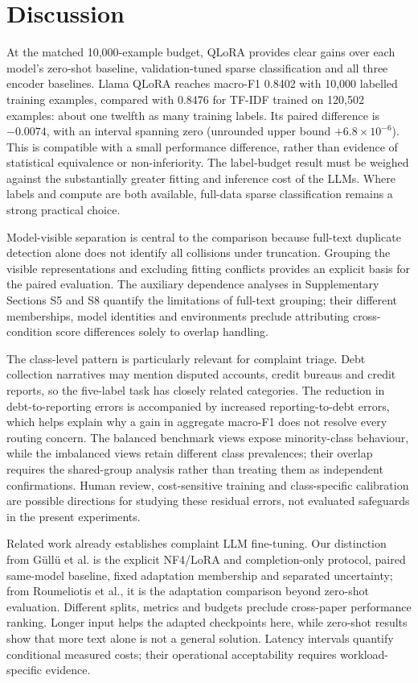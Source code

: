 \documentclass{elektr}
\begin{document}
\section{Discussion}
\label{sec:discussion}
At the matched 10,000-example budget, QLoRA provides clear gains over each model's zero-shot baseline, validation-tuned sparse classification and all three encoder baselines. Llama QLoRA reaches macro-F1 0.8402 with 10,000 labelled training examples, compared with 0.8476 for TF-IDF trained on 120,502 examples: about one twelfth as many training labels. Its paired difference is $-0.0074$, with an interval spanning zero (unrounded upper bound $+6.8\times10^{-6}$). This is compatible with a small performance difference, rather than evidence of statistical equivalence or non-inferiority. The label-budget result must be weighed against the substantially greater fitting and inference cost of the LLMs. Where labels and compute are both available, full-data sparse classification remains a strong practical choice.

Model-visible separation is central to the comparison because full-text duplicate detection alone does not identify all collisions under truncation. Grouping the visible representations and excluding fitting conflicts provides an explicit basis for the paired evaluation. The auxiliary dependence analyses in Supplementary Sections S5 and S8 quantify the limitations of full-text grouping; their different memberships, model identities and environments preclude attributing cross-condition score differences solely to overlap handling.

The class-level pattern is particularly relevant for complaint triage. Debt collection narratives may mention disputed accounts, credit bureaus and credit reports, so the five-label task has closely related categories. The reduction in debt-to-reporting errors is accompanied by increased reporting-to-debt errors, which helps explain why a gain in aggregate macro-F1 does not resolve every routing concern. The balanced benchmark views expose minority-class behaviour, while the imbalanced views retain different class prevalences; their overlap requires the shared-group analysis rather than treating them as independent confirmations. Human review, cost-sensitive training and class-specific calibration are possible directions for studying these residual errors, not evaluated safeguards in the present experiments.

Related work already establishes complaint LLM fine-tuning. Our distinction from G\"ull\"u et al. is the explicit NF4/LoRA and completion-only protocol, paired same-model baseline, fixed adaptation membership and separated uncertainty; from Roumeliotis et al., it is the adaptation comparison beyond zero-shot evaluation. Different splits, metrics and budgets preclude cross-paper performance ranking. Longer input helps the adapted checkpoints here, while zero-shot results show that more text alone is not a general solution. Latency intervals quantify conditional measured costs; their operational acceptability requires workload-specific evidence.
\end{document}
